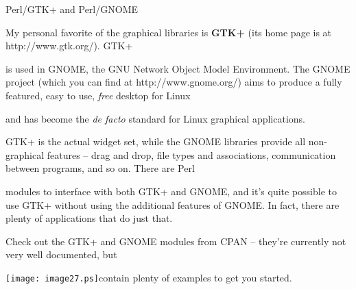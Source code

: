 \documentclass[a4paper,11pt]{book}
\begin{document}
\noindent 

\noindent 

\noindent 

\noindent 

\noindent 

\noindent 

\noindent 

\noindent 

\noindent 

\noindent 

\noindent 

\noindent Perl/GTK+ and Perl/GNOME

\noindent 

\noindent My personal favorite of the graphical libraries is \textbf{GTK+ }(its home page is at http://www.gtk.org/). GTK+

\noindent is used in GNOME, the GNU Network Object Model Environment. The GNOME project (which you can find at http://www.gnome.org/) aims to produce a fully featured, easy to use, \textit{free }desktop for Linux

\noindent and has become the \textit{de facto }standard for Linux graphical applications.

\noindent 

\noindent GTK+ is the actual widget set, while the GNOME libraries provide all non-graphical features -- drag and drop, file types and associations, communication between programs, and so on. There are Perl

\noindent modules to interface with both GTK+ and GNOME, and it's quite possible to use GTK+ without using the additional features of GNOME. In fact, there are plenty of applications that do just that.

\noindent 

\noindent 

\noindent Check out the GTK+ and GNOME modules from CPAN -- they're currently not very well documented, but

\noindent \texttt{[image: image27.ps]}contain plenty of examples to get you started.

\noindent 

\noindent 

\noindent 

\noindent 

\noindent 

\noindent 

\noindent 
\end{document}
